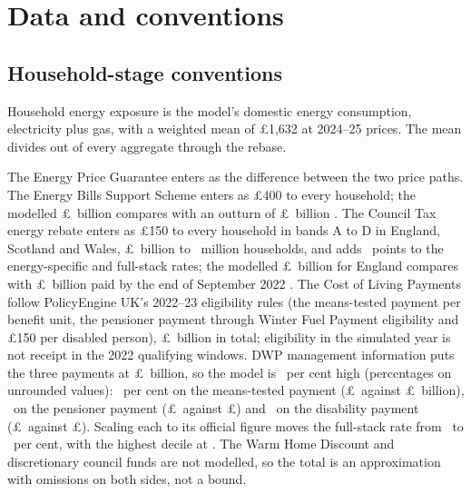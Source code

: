 \appendix
\setcounter{figure}{0}\setcounter{table}{0}
\renewcommand{\thefigure}{A\arabic{figure}}
\renewcommand{\thetable}{A\arabic{table}}
\renewcommand{\theHfigure}{A\arabic{figure}}
\renewcommand{\theHtable}{A\arabic{table}}

\section{Data and conventions}\label{app:data}

\subsection{Household-stage conventions}\label{app:conventions}

 Household energy exposure is the model's
domestic energy consumption, electricity plus gas, with a weighted
mean of \pounds 1{,}632 at 2024--25 prices. The mean divides out of
every aggregate through the rebase.

 The Energy Price Guarantee enters as the
difference between the two price paths. The Energy Bills Support
Scheme enters as \pounds 400 to every household; the modelled
\pounds\SsEbssBn\ billion compares with an outturn of
\pounds\SsEbssOutturnBn\ billion \citep{nao2024}. The Council Tax
energy rebate enters as \pounds 150 to every household in bands A to D
in England, Scotland and Wales, \pounds\SsCtrBn\ billion to
\SsCtrHouseholdsM\ million households, and adds \SsCtrRateAddPp\
points to the energy-specific and full-stack rates; the modelled
\pounds\SsCtrEnglandBn\ billion for England compares with
\pounds\SsCtrOutturnEnglandBn\ billion paid by the end of September
2022 \citep{dluhcctr}. The Cost of Living Payments follow PolicyEngine
UK's 2022--23 eligibility rules (the means-tested payment per benefit
unit, the pensioner payment through Winter Fuel Payment eligibility
and \pounds 150 per disabled person), \pounds\SsColBn\ billion in
total; eligibility in the simulated year is not receipt in the 2022
qualifying windows. DWP management information \citep{dwpcol} puts the
three payments at \pounds\SsColOutturnTotalBn\ billion, so the model
is \SsColOutturnTotalExcessPct\ per cent high (percentages on
unrounded values):
\SsColOutturnMtExcessPct\ per cent on the means-tested payment
(\pounds\SsColModelMtBn\ against \pounds\SsColOutturnMtBn\ billion),
\SsColOutturnPenExcessPct\ on the pensioner payment
(\pounds\SsColModelPenBn\ against \pounds\SsColOutturnPenBn) and
\SsColOutturnDisExcessPct\ on the disability payment
(\pounds\SsColModelDisBn\ against \pounds\SsColOutturnDisBn). Scaling
each to its official figure moves the full-stack rate from
\SsDiscretionaryRatePct\ to \SsColOutturnCalFullRatePct\ per cent, with
the highest decile at \SsColOutturnCalFullMaxDecilePct. The Warm Home
Discount and discretionary council funds are not modelled, so the
total is an approximation with omissions on both sides, not a bound.


